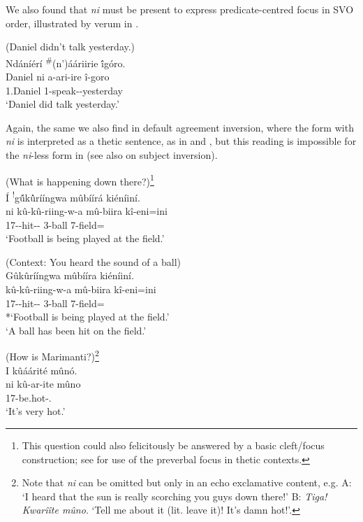 \documentclass[output=paper]{langscibook}
\begin{document}
\z

We also found that \textit{ni} must be present to express predicate-centred focus in SVO order, illustrated by verum in .

\ea
\label{bkm:Ref125200571}
(Daniel didn’t talk yesterday.)\\
Ndáníérí \textsuperscript{\#}(n’)ááriirie \'{î}góro.\\
\gll
Daniel  ni  a-ari-ire  î-goro\\
1.Daniel \FOC{}  1\SM{}-speak--yesterday\\
\glt
‘Daniel did talk yesterday.’

\z


Again, the same we also find in default agreement inversion, where the form with \textit{ni} is interpreted as a thetic sentence, as in  and , but this reading is impossible for the \textit{ni}-less form in  (see also  on subject inversion).

\ea
\label{bkm:Ref94543674}
\ea
\label{bkm:Ref94543674:a}
(What is happening down there?)\footnote{This question could also felicitously be answered by a basic cleft/focus construction; see  for use of the preverbal focus in thetic contexts.}\\
Í \textsuperscript{!}g\'{û}k\`{û}rííngwa mûbíírá kiéníiní.\\
\gll
ni  kû-kû-riing-w-a  mû-biira  kî-eni=ini\\
\FOC{} 17\SM-\PRS{}-hit-\PASS-\FV{} 3-ball  7-field=\LOC{}\\
\glt
‘Football is being played at the field.’

\ex
\label{bkm:Ref94543674:b}
(Context: You heard the sound of a ball)\\
Gûkûrííngwa mûbííra kiéníiní.\\
\gll
kû-kû-riing-w-a  mû-biira  kî-eni=ini\\
17\SM-\PRS{}-hit-\PASS-\FV{} 3-ball  7-field=\LOC{}\\
\glt
*`Football is being played at the field.’\\
‘A ball has been hit on the field.’

\z
\ex
\label{bkm:Ref117537348}
(How is Marimanti?)\footnote{Note that \textit{ni} can be omitted but only in an echo exclamative content, e.g. A: ‘I heard that the sun is really scorching you guys down there!’ B: \textit{Tiga! Kwarîîte mûno}. ‘Tell me about it (lit. leave it)! It’s damn hot!’.}\\
I kûáárité mûnó.\\
\gll
ni  kû-ar-ite  mûno\\
\FOC{}  17\SM{}-be.hot-\STAT.\PFV{} \INT{}\\
\glt
‘It’s very hot.’
\end{document}
